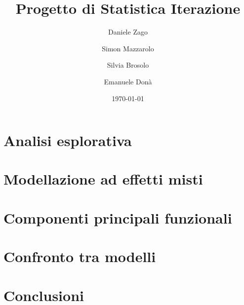 \documentclass{article}
\title{Progetto di Statistica Iterazione}
\author{Daniele Zago \and Simon Mazzarolo \and Silvia Brosolo \and Emanuele Donà}
\date{\today}
\begin{document}
\maketitle

\section{Analisi esplorativa}

\section{Modellazione ad effetti misti}

\section{Componenti principali funzionali}

\section{Confronto tra modelli}

\section{Conclusioni}










\nocite{goodrich2020,gelman2007, vehtari2016, vehtari2020, vehtari2021, blei2017, hoffman2014, kucukelbir2015, wang2016a, betancourt2018}
\printbibliography
\end{document}

